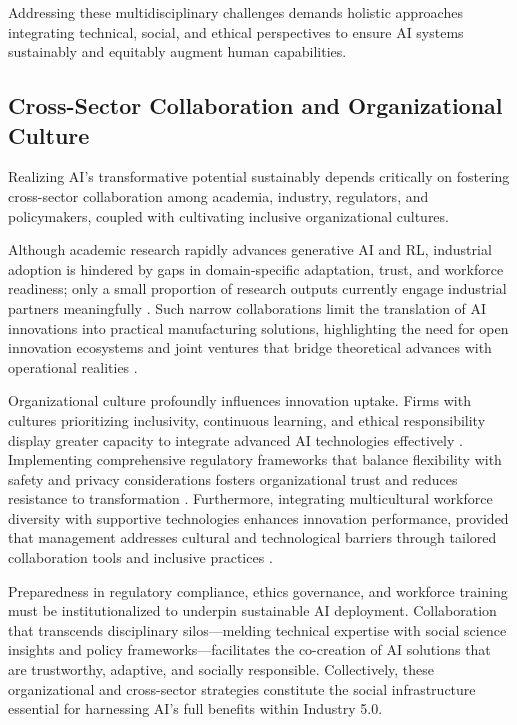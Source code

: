 \documentclass[sigconf]{acmart}
\begin{document}
Addressing these multidisciplinary challenges demands holistic approaches integrating technical, social, and ethical perspectives to ensure AI systems sustainably and equitably augment human capabilities.

\subsection{Cross-Sector Collaboration and Organizational Culture}

Realizing AI’s transformative potential sustainably depends critically on fostering cross-sector collaboration among academia, industry, regulators, and policymakers, coupled with cultivating inclusive organizational cultures.

Although academic research rapidly advances generative AI and RL, industrial adoption is hindered by gaps in domain-specific adaptation, trust, and workforce readiness; only a small proportion of research outputs currently engage industrial partners meaningfully \cite{ref7}. Such narrow collaborations limit the translation of AI innovations into practical manufacturing solutions, highlighting the need for open innovation ecosystems and joint ventures that bridge theoretical advances with operational realities \cite{ref3}.

Organizational culture profoundly influences innovation uptake. Firms with cultures prioritizing inclusivity, continuous learning, and ethical responsibility display greater capacity to integrate advanced AI technologies effectively \cite{ref22,ref27}. Implementing comprehensive regulatory frameworks that balance flexibility with safety and privacy considerations fosters organizational trust and reduces resistance to transformation \cite{ref3}. Furthermore, integrating multicultural workforce diversity with supportive technologies enhances innovation performance, provided that management addresses cultural and technological barriers through tailored collaboration tools and inclusive practices \cite{ref24}.

Preparedness in regulatory compliance, ethics governance, and workforce training must be institutionalized to underpin sustainable AI deployment. Collaboration that transcends disciplinary silos—melding technical expertise with social science insights and policy frameworks—facilitates the co-creation of AI solutions that are trustworthy, adaptive, and socially responsible. Collectively, these organizational and cross-sector strategies constitute the social infrastructure essential for harnessing AI’s full benefits within Industry 5.0.
\end{document}

